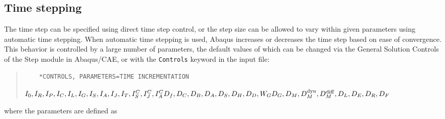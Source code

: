 \documentclass[10pt,letterpaper,oneside]{report}
\newcommand{\scas}[1]{\mbox{{\scriptsize{${\rm{#1}}$}}}{}}
\begin{document}
\subsection{Time stepping}
The time step can be specified using direct time step control, or the step size can be allowed to vary within given parameters using automatic time stepping.  When automatic time stepping is used, Abaqus increases or decreases the time step based on ease of convergence.  This behavior is controlled by a large number of parameters, the default values of which can be changed via the General Solution Controls of the Step module in Abaqus/CAE, or with the \texttt{Controls} keyword in the input file:
\begin{quote} 
    \begin{lstlisting}
    *CONTROLS, PARAMETERS=TIME INCREMENTATION
    \end{lstlisting} 
    $I_0, I_R, I_P, I_C, I_L, I_G, I_S, I_A, I_J, I_T, I^C_S, I^C_J, I^C_A \\
    D_f, D_C, D_B, D_A, D_S, D_H, D_D, W_G \\
    D_G, D_M, D_M^{\scas{dyn}}, D_M^{\scas{diff}}, D_L, D_E, D_R, D_F$
\end{quote}
where the parameters are defined as 
\end{document}
